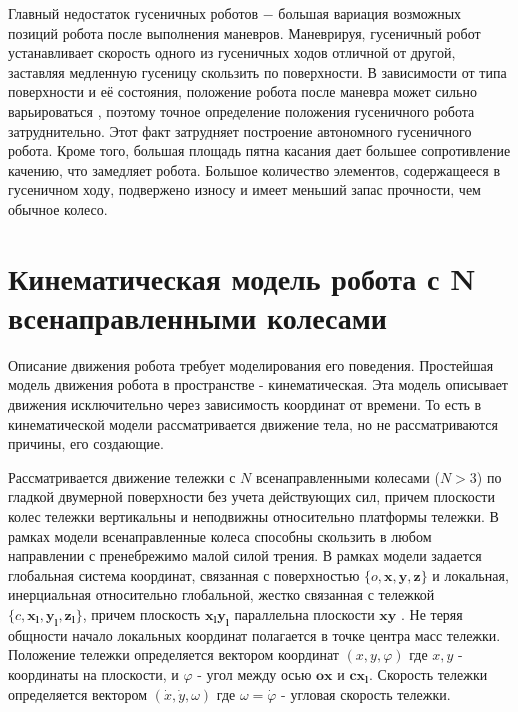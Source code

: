 \documentclass[oneside,final,14pt]{extreport}
\newcommand{\bs}{\boldsymbol}
\begin{document}
Главный недостаток гусеничных роботов $-$ большая вариация возможных позиций робота после выполнения маневров. Маневрируя, гусеничный робот устанавливает скорость одного из гусеничных ходов отличной от другой, заставляя медленную гусеницу скользить по поверхности. В зависимости от типа поверхности и её состояния, положение робота после маневра может сильно варьироваться \cite{Siegwart}, поэтому точное определение положения гусеничного робота затруднительно. Этот факт затрудняет построение автономного гусеничного робота. Кроме того, большая площадь пятна касания дает большее сопротивление качению, что замедляет робота. Большое количество элементов, содержащееся в гусеничном ходу, подвержено износу и имеет меньший запас прочности, чем обычное колесо. 
\iffalse
Гусеничный ход - компромисс в пользу проходимости робота по пересеченной местности. Несмотря на все недостатки, гусеничные роботы широко в качестве боевых \cite{SaperJournal}.
\fi
\chapter{Кинематическая модель робота с N всенаправленными колесами}  
\label{chap:KinematicOmniWheelModel} 
Описание движения робота требует моделирования его поведения. Простейшая модель движения робота в пространстве - кинематическая. Эта модель описывает движения исключительно через зависимость координат от времени. То есть в кинематической модели рассматривается движение тела, но не рассматриваются причины, его создающие.

Рассматривается движение тележки с $N$ всенаправленными колесами ($N > 3$) по гладкой двумерной поверхности без учета действующих сил, причем плоскости колес тележки вертикальны и неподвижны относительно платформы тележки. В рамках модели всенаправленные колеса способны скользить в любом направлении с пренебрежимо малой силой трения. В рамках модели задается глобальная система координат, связанная с поверхностью $\{o,\boldsymbol{x},\bs{y},\bs{z}\}$ и локальная,  инерциальная относительно глобальной, жестко связанная с тележкой $\{c,\bs{x_{l}},\bs{y_{l}},\bs{z_{l}}\}$, причем плоскость $\bs{x_{l}}\bs{y_{l}}$  параллельна плоскости $\bs{x}\bs{y}$ . Не теряя общности начало локальных координат полагается в точке центра масс тележки. Положение тележки определяется вектором координат $(x,y,\varphi)$
где $x,y$ - координаты на плоскости, и $\varphi$ -  угол между осью $\bs{ox}$ и $\bs{cx_{l}}$. Скорость тележки определяется вектором $(\dot{x},\dot{y},\omega)$ где $\omega = \dot{\varphi}$ - угловая скорость тележки. 
\end{document}
